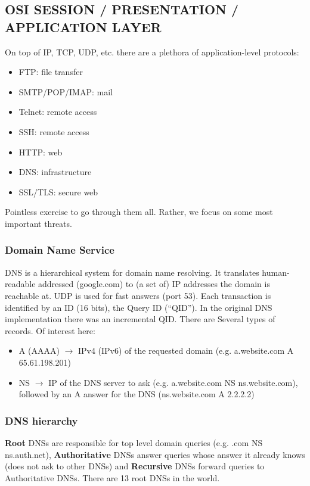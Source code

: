 \documentclass[a4paper, 10pt, titlepage]{article}
\begin{document}

\subsection{OSI SESSION / PRESENTATION / APPLICATION LAYER}
On top of IP, TCP, UDP, etc. there are a plethora of application-level protocols:
\begin{itemize}
	\item FTP: file transfer
	\item SMTP/POP/IMAP: mail
	\item Telnet: remote access
	\item SSH: remote access
	\item HTTP: web
	\item DNS: infrastructure
	\item SSL/TLS: secure web
\end{itemize}
Pointless exercise to go through them all. Rather, we focus on some most important threats.

\subsubsection{Domain Name Service}
DNS is a hierarchical system for domain name resolving. It translates human-readable addressed (google.com) to (a set of) IP addresses the domain is reachable at. UDP is used for fast answers (port 53). Each transaction is identified by an ID (16 bits), the Query ID (“QID”). In the original DNS implementation there was an incremental QID. There are Several types of records. Of interest here:
\begin{itemize}
	\item A (AAAA) $\rightarrow$ IPv4 (IPv6) of the requested domain (e.g. a.website.com A 65.61.198.201)
	\item NS $\rightarrow$ IP of the DNS server to ask (e.g. a.website.com NS ns.website.com), followed by an A answer for the DNS (ns.website.com A 2.2.2.2)
\end{itemize}

\subsubsection*{DNS hierarchy}
\textbf{Root} DNSs are responsible for top level domain queries (e.g. .com NS ns.auth.net), \textbf{Authoritative} DNSs answer queries whose answer it already knows (does not ask to other DNSs) and \textbf{Recursive} DNSs forward queries to Authoritative DNSs. There are 13 root DNSs in the world.
\end{document}
